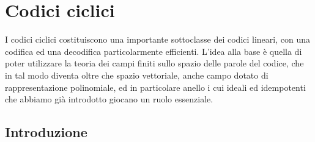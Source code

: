 \chapter{Codici ciclici}

I codici ciclici costituiscono una importante sottoclasse dei codici lineari, con una codifica ed una decodifica particolarmente efficienti. L'idea alla base è quella di poter utilizzare la teoria dei campi finiti sullo spazio delle parole del codice, che in tal modo diventa oltre che spazio vettoriale, anche campo dotato di rappresentazione polinomiale, ed in particolare anello i cui ideali ed idempotenti che abbiamo già introdotto giocano un ruolo essenziale.

\section{Introduzione}

